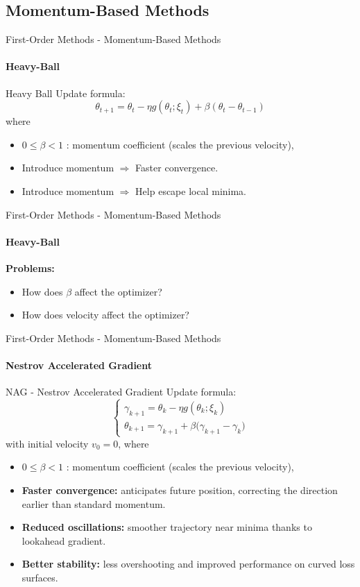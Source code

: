 \documentclass{beamer}
\begin{document}
\subsection{Momentum-Based Methods}
\begin{frame}[fragile]{First-Order Methods - Momentum-Based Methods}
\framesubtitle{Heavy-Ball}
\begin{block}{Heavy Ball}
Update formula:
\[
\theta_{t+1}=\theta_t - \eta g(\theta_t;\xi_t) +\beta(\theta_t -\theta_{t-1})
\]
where
\begin{itemize}
    \item $0 \le \beta < 1$ : momentum coefficient (scales the previous velocity),
\end{itemize}
\end{block}
\begin{itemize}
    \item Introduce momentum $\Rightarrow$ Faster convergence.
    \item Introduce momentum $\Rightarrow$ Help escape local minima.
\end{itemize}
\end{frame}

\begin{frame}[fragile]{First-Order Methods - Momentum-Based Methods}
\framesubtitle{Heavy-Ball}
\textbf{Problems:}
\begin{itemize}
    \item How does $\beta$ affect the optimizer?  
    \item How does velocity affect the optimizer? 
\end{itemize}
\end{frame}

\begin{frame}[fragile]{First-Order Methods - Momentum-Based Methods}
\framesubtitle{Nestrov Accelerated Gradient}
\begin{block}{NAG - Nestrov Accelerated Gradient}
Update formula:
\[
\begin{cases}
\gamma_{k+1} = \theta_k - \eta g(\theta_k; \xi_k) \\
\theta_{k+1} = \gamma_{k+1} + \beta \big(\gamma_{k+1} - \gamma_k)
\end{cases}
\]
with initial velocity \(v_0 = 0\), where
\begin{itemize}
    \item $0 \le \beta < 1$ : momentum coefficient (scales the previous velocity),
\end{itemize}
\end{block}
\begin{itemize}
    \item \textbf{Faster convergence:} anticipates future position, correcting the direction earlier than standard momentum.
    \item \textbf{Reduced oscillations:} smoother trajectory near minima thanks to lookahead gradient.
    \item \textbf{Better stability:} less overshooting and improved performance on curved loss surfaces.
\end{itemize}
\end{frame}
\end{document}
